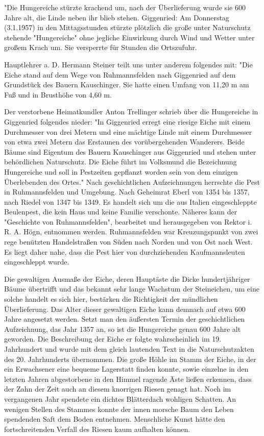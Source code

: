 "Die Hungereiche stürzte krachend um, nach der Überlieferung wurde sie 600 Jahre
alt, die Linde neben ihr blieb stehen. Giggenried: Am Donnerstag (3.1.1957) in
den Mittagsstunden stürzte plötzlich die große unter Naturschutz stehende
"Hungereiche" ohne jegliche Einwirkung durch Wind und Wetter unter großem Krach
um. Sie versperrte für Stunden die Ortszufuhr.

Hauptlehrer a. D. Hermann Steiner teilt uns unter anderem folgendes mit: "Die
Eiche stand auf dem Wege von Ruhmannsfelden nach Giggenried auf dem Grundstück
des Bauern Kauschinger. Sie hatte einen Umfang von 11,20 m am Fuß und in
Brusthöhe von 4,60 m.

Der verstorbene Heimatkundler Anton Trellinger schrieb über die Hungereiche in
Giggenried folgendes nieder: "In Giggenried erregt eine riesige Eiche mit einem
Durchmesser von drei Metern und eine mächtige Linde mit einem Durchmesser von
etwa zwei Metern das Erstaunen des vorübergehenden Wanderers. Beide Bäume sind
Eigentum des Bauern Kauschinger aus Giggenried und stehen unter behördlichen
Naturschutz. Die Eiche führt im Volksmund die Bezeichnung Hungereiche und soll
in Pestzeiten gepflanzt worden sein von dem einzigen Überlebenden des Ortes."
Nach geschichtlichen Aufzeichnungen herrschte die Pest in Ruhmannsfelden und
Umgebung. Nach Geheimrat Eberl von 1354 bis 1357, nach Riedel     von 1347 bis
1349. Es handelt sich um die aus Italien eingeschleppte Beulenpest, die kein
Haus und keine Familie verschonte. Näheres kann der "Geschichte von
Ruhmannsfelden", bearbeitet und herausgegeben von Rektor i. R. A. Högn,
entnommen werden. Ruhmannsfelden war Kreuzungspunkt von zwei rege benützten
Handelstraßen von Süden nach Norden und von Ost nach West. Es liegt daher nahe,
dass die Pest hier von durchziehenden Kaufmannsleuten eingeschleppt wurde.

Die gewaltigen Ausmaße der Eiche, deren Hauptäste die Dicke hundertjähriger
Bäume übertrifft und das bekannt sehr lange Wachstum der Steineichen, um eine
solche handelt es sich hier, bestärken die Richtigkeit der mündlichen
Überlieferung. Das Alter dieser gewaltigen Eiche kann demnach auf etwa 600 Jahre
angesetzt werden. Setzt man den äußersten Termin der geschichtlichen
Aufzeichnung, das Jahr 1357 an, so ist die Hungereiche genau 600 Jahre alt
geworden. Die Beschreibung der Eiche er folgte wahrscheinlich im 19. Jahrhundert
und wurde mit dem gleich lautenden Text in die Naturschutzakten des 20.
Jahrhunderts übernommen. Die große Höhle im Stamm der Eiche, in der ein
Erwachsener eine bequeme Lagerstatt finden konnte, sowie einzelne in den letzten
Jahren abgestorbene in den Himmel ragende Äste ließen erkennen, dass der Zahn
der Zeit auch an diesem knorrigen Riesen genagt hat. Noch im vergangenen Jahr
spendete ein dichtes Blätterdach wohligen Schatten. An wenigen Stellen des
Stammes konnte der innen morsche Baum den Leben spendenden Saft dem Boden
entnehmen. Menschliche Kunst hätte den fortschreitenden Verfall des Riesen kaum
aufhalten können.

